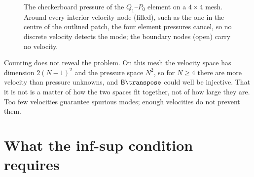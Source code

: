 \begin{figure}[tbp]
    \centering
    \caption[The checkerboard pressure mode of the $Q_1$--$P_0$ element]{The checkerboard pressure of the $Q_1$--$P_0$ element on a $4 \times 4$ mesh. Around every interior velocity node (filled), such as the one in the centre of the outlined patch, the four element pressures cancel, so no discrete velocity detects the mode; the boundary nodes (open) carry no velocity.}
    \label{fig:infsup-checkerboard}
\end{figure}

Counting does not reveal the problem. On this mesh the velocity space has dimension $2(N-1)^2$ and the pressure space $N^2$, so for $N \geq 4$ there are more velocity than pressure unknowns, and $\mathsf{B}\transpose$ could well be injective. That it is not is a matter of how the two spaces fit together, not of how large they are. Too few velocities guarantee spurious modes; enough velocities do not prevent them.

\section{What the inf-sup condition requires}\label{sec:infsup-condition}

